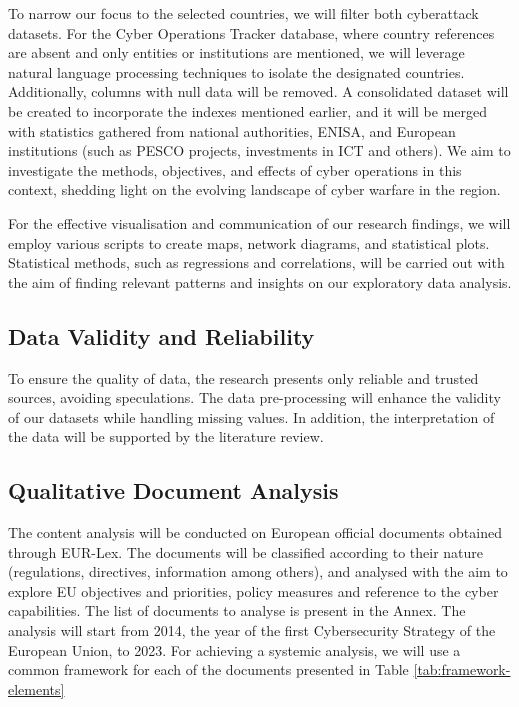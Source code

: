 To narrow our focus to the selected countries, we will filter both cyberattack datasets. For the Cyber Operations Tracker database, where country references are absent and only entities or institutions are mentioned, we will leverage natural language processing techniques to isolate the designated countries. Additionally, columns with null data will be removed. A consolidated dataset will be created to incorporate the indexes mentioned earlier, and it will be merged with statistics gathered from national authorities, ENISA, and European institutions (such as PESCO projects, investments in ICT and others). We aim to investigate the methods, objectives, and effects of cyber operations in this context, shedding light on the evolving landscape of cyber warfare in the region.

For the effective visualisation and communication of our research findings, we will employ various scripts to create maps, network diagrams, and statistical plots. Statistical methods, such as regressions and correlations, will be carried out with the aim of finding relevant patterns and insights on our exploratory data analysis.


\subsection{Data Validity and Reliability}

To ensure the quality of data, the research presents only reliable and trusted sources, avoiding speculations. The data pre-processing will enhance the validity of our datasets while handling missing values. In addition, the interpretation of the data will be supported by the literature review. 

\subsection{Qualitative Document Analysis}

The content analysis will be conducted on European official documents obtained through EUR-Lex. The documents will be classified according to their nature (regulations, directives, information among others), and analysed with the aim to explore EU objectives and priorities, policy measures and reference to the cyber capabilities. 
The list of documents to analyse is present in the Annex. The analysis will start from 2014, the year of the first Cybersecurity Strategy of the European Union, to 2023. For achieving a systemic analysis, we will use a common framework for each of the documents presented in Table \ref{tab:framework-elements}

